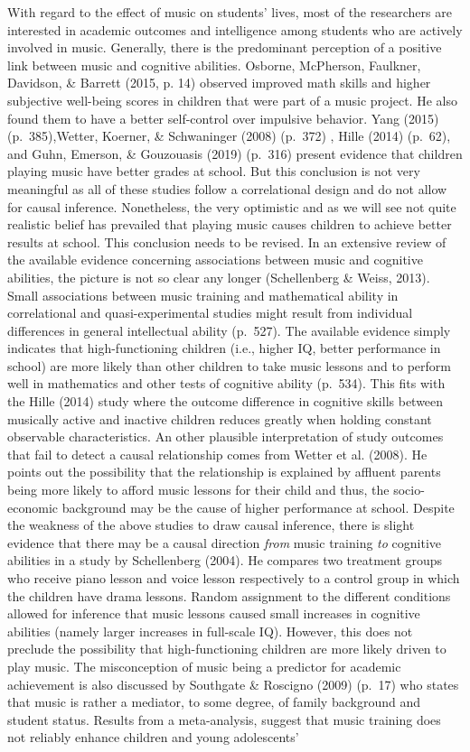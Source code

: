 \documentclass[a4, 12pt]{article}
\begin{document}
\label{ch:roleofmusic}
With regard to the effect of music on students' lives, most of the researchers are interested in academic outcomes and intelligence among students who are actively involved in music. Generally, there is the predominant perception of a positive link between music and cognitive abilities. Osborne, McPherson, Faulkner, Davidson, \& Barrett (2015, p. 14) observed improved math skills and higher subjective well-being scores in children that were part of a music project. He also found them to have a better self-control over impulsive behavior. Yang (2015) (p.~385),Wetter, Koerner, \& Schwaninger (2008) (p.~372) , Hille (2014) (p.~62), and Guhn, Emerson, \& Gouzouasis (2019) (p.~316) present evidence that children playing music have better grades at school. But this conclusion is not very meaningful as all of these studies follow a correlational design and do not allow for causal inference. Nonetheless, the very optimistic and as we will see not quite realistic belief has prevailed that playing music causes children to achieve better results at school. This conclusion needs to be revised. In an extensive review of the available evidence concerning associations between music and cognitive abilities, the picture is not so clear any longer (Schellenberg \& Weiss, 2013). Small associations between music training and mathematical ability in correlational and quasi-experimental studies might result from individual differences in general intellectual ability (p.~527). The available evidence simply indicates that high-functioning children (i.e., higher IQ, better performance in school) are more likely than other children to take music lessons and to perform well in mathematics and other tests of cognitive ability (p.~534). This fits with the Hille (2014) study where the outcome difference in cognitive skills between musically active and inactive children reduces greatly when holding constant observable characteristics. An other plausible interpretation of study outcomes that fail to detect a causal relationship comes from Wetter et al. (2008). He points out the possibility that the relationship is explained by affluent parents being more likely to afford music lessons for their child and thus, the socio-economic background may be the cause of higher performance at school. Despite the weakness of the above studies to draw causal inference, there is slight evidence that there may be a causal direction \emph{from} music training \emph{to} cognitive abilities in a study by Schellenberg (2004). He compares two treatment groups who receive piano lesson and voice lesson respectively to a control group in which the children have drama lessons. Random assignment to the different conditions allowed for inference that music lessons caused small increases in cognitive abilities (namely larger increases in full-scale IQ). However, this does not preclude the possibility that high-functioning children are more likely driven to play music. The misconception of music being a predictor for academic achievement is also discussed by Southgate \& Roscigno (2009) (p.~17) who states that music is rather a mediator, to some degree, of family background and student status. Results from a meta-analysis, suggest that music training does not reliably enhance children and young adolescents' 
\end{document}
